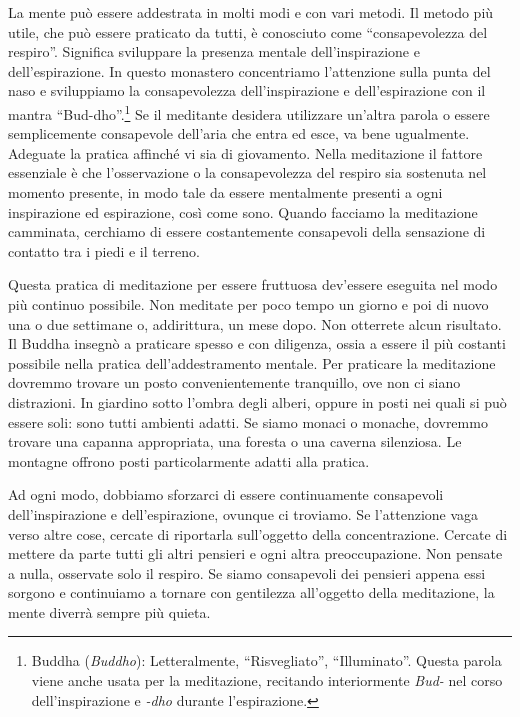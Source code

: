 La mente può essere addestrata in molti modi e con vari metodi. Il
metodo più utile, che può essere praticato da tutti, è conosciuto come
``consapevolezza del respiro''. Significa sviluppare la presenza mentale
dell'inspirazione e dell'espirazione. In questo monastero concentriamo
l'attenzione sulla punta del naso e sviluppiamo la consapevolezza
dell'inspirazione e dell'espirazione con il mantra
``Bud-dho''.\footnote{Buddha (\emph{Buddho}): Letteralmente,
  ``Risvegliato'', ``Illuminato''. Questa parola viene anche usata per
  la meditazione, recitando interiormente \emph{Bud-} nel corso
  dell'inspirazione e \emph{-dho} durante l'espirazione.} Se il
meditante desidera utilizzare un'altra parola o essere semplicemente
consapevole dell'aria che entra ed esce, va bene ugualmente. Adeguate la
pratica affinché vi sia di giovamento. Nella meditazione il fattore
essenziale è che l'osservazione o la consapevolezza del respiro sia
sostenuta nel momento presente, in modo tale da essere mentalmente
presenti a ogni inspirazione ed espirazione, così come sono. Quando
facciamo la meditazione camminata, cerchiamo di essere costantemente
consapevoli della sensazione di contatto tra i piedi e il terreno.

Questa pratica di meditazione per essere fruttuosa dev'essere eseguita
nel modo più continuo possibile. Non meditate per poco tempo un giorno e
poi di nuovo una o due settimane o, addirittura, un mese dopo. Non
otterrete alcun risultato. Il Buddha insegnò a praticare spesso e con
diligenza, ossia a essere il più costanti possibile nella pratica
dell'addestramento mentale. Per praticare la meditazione dovremmo
trovare un posto convenientemente tranquillo, ove non ci siano
distrazioni. In giardino sotto l'ombra degli alberi, oppure in posti nei
quali si può essere soli: sono tutti ambienti adatti. Se siamo monaci o
monache, dovremmo trovare una capanna appropriata, una foresta o una
caverna silenziosa. Le montagne offrono posti particolarmente adatti
alla pratica.

Ad ogni modo, dobbiamo sforzarci di essere continuamente consapevoli
dell'inspirazione e dell'espirazione, ovunque ci troviamo. Se
l'attenzione vaga verso altre cose, cercate di riportarla sull'oggetto
della concentrazione. Cercate di mettere da parte tutti gli altri
pensieri e ogni altra preoccupazione. Non pensate a nulla, osservate
solo il respiro. Se siamo consapevoli dei pensieri appena essi sorgono e
continuiamo a tornare con gentilezza all'oggetto della meditazione, la
mente diverrà sempre più quieta.

